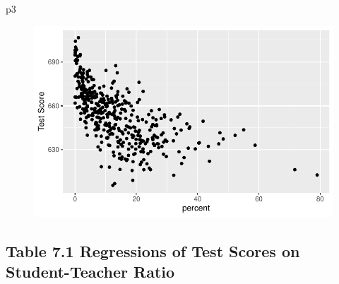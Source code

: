 \documentclass[
  letterpaper,
  DIV=11,
  numbers=noendperiod]{scrartcl}
\newenvironment{Shaded}{\begin{snugshade}}{\end{snugshade}}
\newcommand{\NormalTok}[1]{\textcolor[rgb]{0.85,0.87,0.91}{#1}}
\begin{document}
\hypertarget{section-16}{%
\subsection{}\label{section-16}}

\begin{Shaded}
\begin{Highlighting}[]
\NormalTok{p3}
\end{Highlighting}
\end{Shaded}

\begin{figure}[H]

{\centering \includegraphics{Ch6_7_SW_files/figure-pdf/unnamed-chunk-11-1.pdf}

}

\end{figure}

\hypertarget{table-7.1-regressions-of-test-scores-on-student-teacher-ratio}{%
\subsection{Table 7.1 Regressions of Test Scores on Student-Teacher
Ratio}\label{table-7.1-regressions-of-test-scores-on-student-teacher-ratio}}
\end{document}
